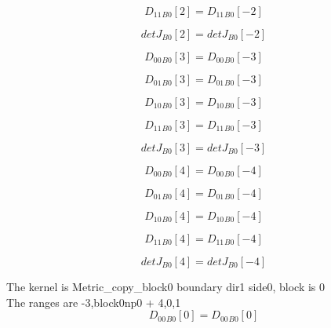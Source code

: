 \documentclass{article}
\begin{document}
\begin{dmath}{D_{11}{_{B0}}}[{2}] = {D_{11}{_{B0}}}[{-2}]\end{dmath}

\begin{dmath}{detJ{_{B0}}}[{2}] = {detJ{_{B0}}}[{-2}]\end{dmath}

\begin{dmath}{D_{00}{_{B0}}}[{3}] = {D_{00}{_{B0}}}[{-3}]\end{dmath}

\begin{dmath}{D_{01}{_{B0}}}[{3}] = {D_{01}{_{B0}}}[{-3}]\end{dmath}

\begin{dmath}{D_{10}{_{B0}}}[{3}] = {D_{10}{_{B0}}}[{-3}]\end{dmath}

\begin{dmath}{D_{11}{_{B0}}}[{3}] = {D_{11}{_{B0}}}[{-3}]\end{dmath}

\begin{dmath}{detJ{_{B0}}}[{3}] = {detJ{_{B0}}}[{-3}]\end{dmath}

\begin{dmath}{D_{00}{_{B0}}}[{4}] = {D_{00}{_{B0}}}[{-4}]\end{dmath}

\begin{dmath}{D_{01}{_{B0}}}[{4}] = {D_{01}{_{B0}}}[{-4}]\end{dmath}

\begin{dmath}{D_{10}{_{B0}}}[{4}] = {D_{10}{_{B0}}}[{-4}]\end{dmath}

\begin{dmath}{D_{11}{_{B0}}}[{4}] = {D_{11}{_{B0}}}[{-4}]\end{dmath}

\begin{dmath}{detJ{_{B0}}}[{4}] = {detJ{_{B0}}}[{-4}]\end{dmath}

\noindent The kernel is Metric_copy_block0 boundary dir1 side0, block is 0\\\noindent The ranges are -3,block0np0 + 4,0,1\\\begin{dmath}{D_{00}{_{B0}}}[{0}] = {D_{00}{_{B0}}}[{0}]\end{dmath}
\end{document}
